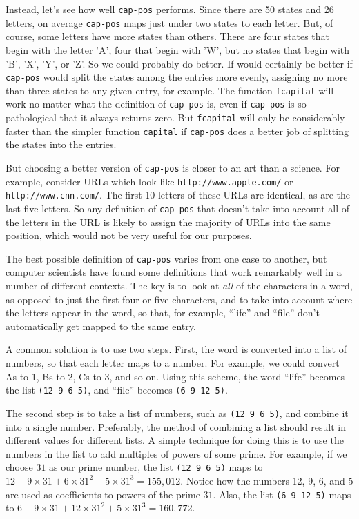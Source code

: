 Instead, let's see how well \texttt{cap-pos} performs. Since there
are 50 states and 26 letters, on average \texttt{cap-pos} maps
just under two states to each letter. But, of course, some letters
have more states than others. There are four states that begin with
the letter 'A', four that begin with 'W', but no states that begin
with 'B', 'X', 'Y', or 'Z'. So we could probably do better. If would
certainly be better if \texttt{cap-pos} would split the states among
the entries more evenly, assigning no more than three states to any
given entry, for example. The function \texttt{fcapital} will work
no matter what the definition of \texttt{cap-pos} is, even if
\texttt{cap-pos} is so pathological that it always returns zero.
But \texttt{fcapital} will only be considerably faster than the
simpler function \texttt{capital} if \texttt{cap-pos} does a better
job of splitting the states into the entries.

But choosing a better version of \texttt{cap-pos} is closer to an
art than a science. For example, consider URLs which look like
\texttt{http://www.apple.com/} or \texttt{http://www.cnn.com/}. The
first 10 letters of these URLs are identical, as are the last five
letters. So any definition of \texttt{cap-pos} that doesn't take into
account all of the letters in the URL is likely to assign the majority
of URLs into the same position, which would not be very useful for
our purposes.

The best possible definition of \texttt{cap-pos} varies from one
case to another, but computer scientists have found some definitions
that work remarkably well in a number of different contexts. The key
is to look at \emph{all} of the characters in a word, as opposed to
just the first four or five characters, and to take into account where
the letters appear in the word, so that, for example, ``life'' and
``file'' don't automatically get mapped to the same entry.

A common solution is to use two steps. First, the word is converted
into a list of numbers, so that each letter maps to a number. For
example, we could convert As to 1, Bs to 2, Cs to 3, and so on.
Using this scheme, the word ``life'' becomes the list \texttt{(12 9 6 5)},
and ``file'' becomes \texttt{(6 9 12 5)}.

The second step is to take a list of numbers, such as \texttt{(12 9 6 5)},
and combine it into a single number. Preferably, the method of
combining a list should result in different values for different lists.
A simple technique for doing this is to use the numbers in the list
to add multiples of powers of some prime. For example, if we choose $31$
as our prime number, the list \texttt{(12 9 6 5)} maps to 
$12 + 9\times31 + 6\times31^2 + 5\times31^3 = 155,012$. Notice how the
numbers 12, 9, 6, and 5 are used as coefficients to powers of the prime $31$.
Also, the list \texttt{(6 9 12 5)} maps to 
$6 + 9\times31 + 12\times31^2 + 5\times31^3 = 160,772$.

